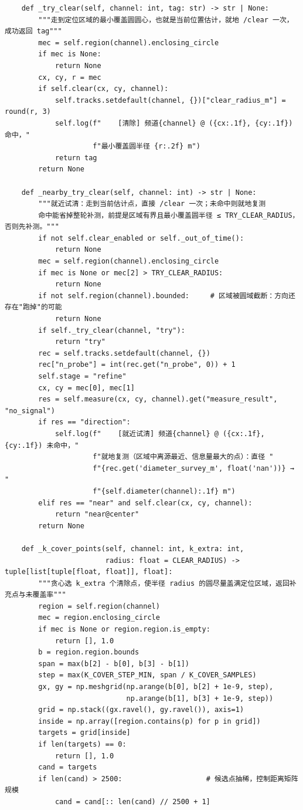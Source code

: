 \documentclass[UTF8, zihao=5,AutoFakeBold=2]{ctexart}
\begin{document}
\begin{lstlisting}
    def _try_clear(self, channel: int, tag: str) -> str | None:
        """走到定位区域的最小覆盖圆圆心，也就是当前位置估计，就地 /clear 一次，成功返回 tag"""
        mec = self.region(channel).enclosing_circle
        if mec is None:
            return None
        cx, cy, r = mec
        if self.clear(cx, cy, channel):
            self.tracks.setdefault(channel, {})["clear_radius_m"] = round(r, 3)
            self.log(f"    [清除] 频道{channel} @ ({cx:.1f}, {cy:.1f}) 命中，"
                     f"最小覆盖圆半径 {r:.2f} m")
            return tag
        return None

    def _nearby_try_clear(self, channel: int) -> str | None:
        """就近试清：走到当前估计点，直接 /clear 一次；未命中则就地复测
        命中能省掉整轮补测，前提是区域有界且最小覆盖圆半径 ≤ TRY_CLEAR_RADIUS，否则先补测。"""
        if not self.clear_enabled or self._out_of_time():
            return None
        mec = self.region(channel).enclosing_circle
        if mec is None or mec[2] > TRY_CLEAR_RADIUS:
            return None
        if not self.region(channel).bounded:     # 区域被圆域截断：方向还存在"跑掉"的可能
            return None
        if self._try_clear(channel, "try"):
            return "try"
        rec = self.tracks.setdefault(channel, {})
        rec["n_probe"] = int(rec.get("n_probe", 0)) + 1
        self.stage = "refine"
        cx, cy = mec[0], mec[1]
        res = self.measure(cx, cy, channel).get("measure_result", "no_signal")
        if res == "direction":
            self.log(f"    [就近试清] 频道{channel} @ ({cx:.1f}, {cy:.1f}) 未命中，"
                     f"就地复测（区域中离源最近、信息量最大的点）：直径 "
                     f"{rec.get('diameter_survey_m', float('nan'))} → "
                     f"{self.diameter(channel):.1f} m")
        elif res == "near" and self.clear(cx, cy, channel):
            return "near@center"
        return None

    def _k_cover_points(self, channel: int, k_extra: int,
                        radius: float = CLEAR_RADIUS) -> tuple[list[tuple[float, float]], float]:
        """贪心选 k_extra 个清除点，使半径 radius 的圆尽量盖满定位区域，返回补充点与未覆盖率"""
        region = self.region(channel)
        mec = region.enclosing_circle
        if mec is None or region.region.is_empty:
            return [], 1.0
        b = region.region.bounds
        span = max(b[2] - b[0], b[3] - b[1])
        step = max(K_COVER_STEP_MIN, span / K_COVER_SAMPLES)
        gx, gy = np.meshgrid(np.arange(b[0], b[2] + 1e-9, step),
                             np.arange(b[1], b[3] + 1e-9, step))
        grid = np.stack((gx.ravel(), gy.ravel()), axis=1)
        inside = np.array([region.contains(p) for p in grid])
        targets = grid[inside]
        if len(targets) == 0:
            return [], 1.0
        cand = targets
        if len(cand) > 2500:                    # 候选点抽稀，控制距离矩阵规模
            cand = cand[:: len(cand) // 2500 + 1]


\end{lstlisting}
\end{document}
